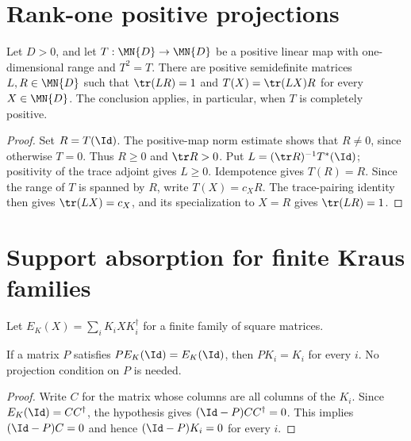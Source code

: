 \section{Rank-one positive projections}

\begin{theorem}
    \label{thm:rank_one_positive_projection_factors}
    \leanok
    Let $D>0$, and let $T:\MN{D}\to\MN{D}$ be a positive linear map
    with one-dimensional range and $T^2=T$. There are positive semidefinite
    matrices $L,R\in\MN{D}$ such that $\tr(LR)=1$ and
    $T(X)=\tr(LX)R$ for every $X\in\MN{D}$. The conclusion applies, in
    particular, when $T$ is completely positive.
\end{theorem}

\begin{proof}\leanok
    Set $R=T(\Id)$. The positive-map norm estimate shows that $R\ne0$,
    since otherwise $T=0$. Thus $R\ge0$ and $\tr R>0$. Put
    $L=(\tr R)^{-1}T^*(\Id)$; positivity of the trace adjoint gives
    $L\ge0$. Idempotence gives $T(R)=R$. Since the range of $T$ is spanned
    by $R$, write $T(X)=c_XR$. The trace-pairing identity then gives
    $\tr(LX)=c_X$, and its specialization to $X=R$ gives $\tr(LR)=1$.
\end{proof}

\section{Support absorption for finite Kraus families}

Let $E_K(X)=\sum_i K_iXK_i^\dagger$ for a finite family of square matrices.

\begin{lemma}
    \label{lem:kraus_left_absorption_map_one}
    \leanok
    If a matrix $P$ satisfies $P E_K(\Id)=E_K(\Id)$, then
    $PK_i=K_i$ for every $i$. No projection condition on $P$ is needed.
\end{lemma}

\begin{proof}\leanok
    Write $C$ for the matrix whose columns are all columns of the $K_i$.
    Since $E_K(\Id)=CC^\dagger$, the hypothesis gives
    $(\Id-P)CC^\dagger=0$. This implies $(\Id-P)C=0$ and hence
    $(\Id-P)K_i=0$ for every $i$.
\end{proof}

